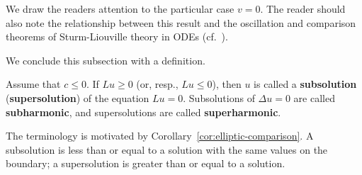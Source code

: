 \begin{Remark}
\label{rem:elliptic-comparison-sturm-liouville}
We draw the reader\textquotesingle s attention to the particular case $v=0$. The reader should also note the relationship between this result and the oscillation and comparison theorems of Sturm-Liouville theory in ODEs (cf.~\cite{In}).
\end{Remark}

We conclude this subsection with a definition.

\begin{Definition}
\label{def:elliptic-subsolution}
Assume that $c\leq0$. If $Lu\geq0$ (or, resp., $Lu\leq0$), then $u$ is called a \textbf{subsolution} (\textbf{supersolution}) of the equation $Lu=0$. Subsolutions of $\Delta u=0$ are called \textbf{subharmonic}, and supersolutions are called \textbf{superharmonic}.
\end{Definition}

The terminology is motivated by Corollary~\ref{cor:elliptic-comparison}. A subsolution is less than or equal to a solution with the same values on the boundary; a supersolution is greater than or equal to a solution.
